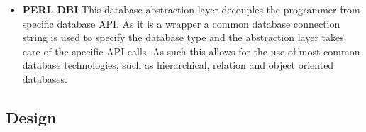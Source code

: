 \begin{multicols}{2}
\begin{itemize}
				\item \textbf{PERL DBI}			
					\newline						
					This database abstraction layer decouples the programmer from specific database API.   As it is a wrapper
					a common database connection string is used to specify the database type and the abstraction layer takes care of the specific
					API calls.  As such this allows for the use of most common database technologies, such as hierarchical, relation and object 
					oriented databases.
					
			\end{itemize}	
			
		\end{multicols}
	
	\subsection{Design}
			
